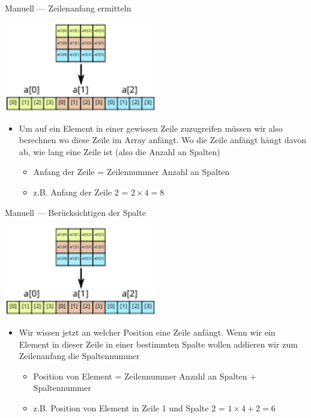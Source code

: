 \documentclass[presentation]{beamer}
\begin{document}
\begin{frame}[label={sec:org1a49f3f}]{Manuell --- Zeilenanfang ermitteln}
\begin{center}\begin{center}
\includegraphics[width=0.5\textwidth]{2dto1d.pdf}
\end{center}\end{center} 
\begin{itemize}
\item Um auf ein Element in einer gewissen Zeile zuzugreifen müssen wir
also berechnen wo diese Zeile im Array anfängt. Wo die Zeile anfängt
hängt davon ab, wie lang eine Zeile ist (also die Anzahl an Spalten)
\begin{itemize}
\item \alert{Anfang der Zeile = Zeilennummer \texttimes{} Anzahl an Spalten}
\item z.B. Anfang der Zeile 2 = \(2 \times 4 = 8\)
\end{itemize}
\end{itemize}
\end{frame}
\begin{frame}[label={sec:org6071735}]{Manuell --- Berücksichtigen der Spalte}
\begin{center}\begin{center}
\includegraphics[width=0.5\textwidth]{2dto1d.pdf}
\end{center}\end{center} 
\begin{itemize}
\item Wir wissen jetzt an welcher Position eine Zeile anfängt. Wenn wir
ein Element in dieser Zeile in einer bestimmten Spalte wollen
addieren wir zum Zeilenanfang die Spaltennummer
\begin{itemize}
\item \alert{Position von Element = Zeilennummer \texttimes{} Anzahl an Spalten + Spaltennummer}
\item z.B. Position von Element in Zeile 1 und Spalte 2 = \(1 \times 4 + 2 = 6\)
\end{itemize}
\end{itemize}
\end{frame}
\end{document}

